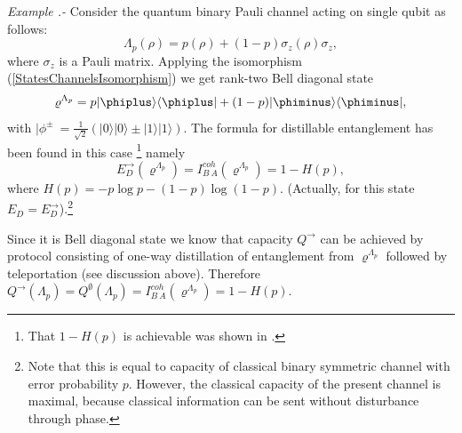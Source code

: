 \documentclass[rmp,12pt,preprint]{revtex4-2}
\begin{document}
{\it Example .- } Consider the quantum binary Pauli channel
acting on single qubit as follows:
\begin{equation}
\Lambda_{p}(\rho)=p(\rho) + (1-p)\sigma_{z}(\rho)\sigma_{z},
\end{equation}
where $\sigma_{z}$ is a Pauli matrix.
Applying the isomorphism (\ref{StatesChannelsIsomorphism}) we get
rank-two Bell diagonal state
\begin{equation}
\varrho^{\Lambda_{p}}=p|\phiplus\rangle\langle\phiplus|
+(1-p)|\phiminus\rangle\langle\phiminus|,
\end{equation}
with $|\phi^{\pm}\>=\frac{1}{\sqrt{2}}(|0\rangle|0\rangle \pm
|1\rangle|1\rangle)$. The formula for distillable entanglement has
been found in this case \cite{Rains1999,Rains-erratum1999}
\footnote{That $1-H(p)$ is achievable
was shown in \cite{BDSW1996}.} namely
\begin{equation}
E_{D}^{\rightarrow}(\varrho^{\Lambda_{p}})=I^{coh}_{B\>A}(\varrho^{\Lambda_{p}})=1-H(p),
\label{Rains}
\end{equation}
 where $H(p)=-p \log p-(1-p)\log (1-p)$. (Actually, for this state $E_D=E_D^{\rightarrow}$).\footnote{Note that this is equal to capacity of classical
 binary symmetric channel with error probability $p$. However,
 the classical capacity of the present channel is maximal,
 because classical information can be sent without disturbance through phase.}

Since it is
Bell diagonal state we know that capacity $Q^{\rightarrow}$
can be achieved by protocol consisting of one-way distillation of
entanglement from $\varrho^{\Lambda_{p}}$ followed by teleportation
(see discussion above). Therefore
$Q^{ \rightarrow }(\Lambda_{p})=Q^{ \emptyset
}(\Lambda_{p})=I^{coh}_{B\>A}(\varrho^{\Lambda_{p}})=1-H(p)$.
\end{document}
